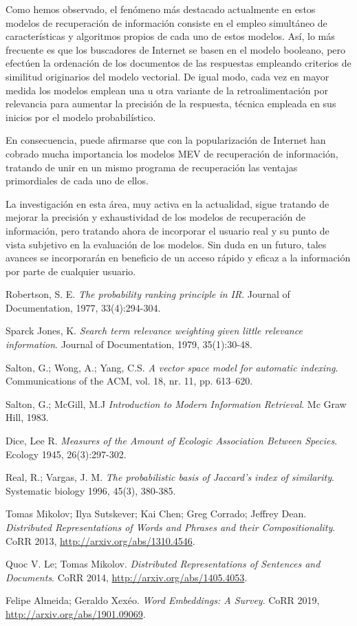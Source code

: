 \documentclass[titlepage]{article}
\begin{document}
Como hemos observado, el fenómeno más destacado actualmente en estos modelos de recuperación de información consiste en el empleo simultáneo de características y algoritmos propios de cada uno de estos modelos. Así, lo más frecuente es que los buscadores de Internet se basen en el modelo booleano, pero efectúen la ordenación de los documentos de las respuestas empleando criterios de similitud originarios del modelo vectorial. De igual modo, cada vez en mayor medida los modelos emplean una u otra variante de la retroalimentación por relevancia para aumentar la precisión de la respuesta, técnica empleada en sus inicios por el modelo probabilístico.

En consecuencia, puede afirmarse que con la popularización de Internet han cobrado mucha importancia los modelos MEV de recuperación de información, tratando de unir en un mismo programa de recuperación las ventajas primordiales de cada uno de ellos. 

La investigación en esta área, muy activa en la actualidad, sigue tratando de mejorar la precisión y exhaustividad de los modelos de recuperación de información, pero tratando ahora de incorporar el usuario real y su punto de vista subjetivo en la evaluación de los modelos. Sin duda en un futuro, tales avances se incorporarán en beneficio de un acceso rápido y eficaz a la información por parte de cualquier usuario.

\renewcommand{\refname}{Bibliografía}
\begin{thebibliography}{999}

Robertson, S. E.
\emph{The probability ranking principle in IR}.
Journal of Documentation, 1977, 33(4):294-304.

Sparck Jones, K.
\emph{Search term relevance weighting given little relevance information}.
Journal of Documentation, 1979, 35(1):30-48.

Salton, G.; Wong, A.; Yang, C.S.
\emph{A vector space model for automatic indexing}.
Communications of the ACM, vol. 18, nr. 11, pp. 613–620.

Salton, G.; McGill, M.J
\emph{Introduction to Modern Information Retrieval}.
Mc Graw Hill, 1983.

Dice, Lee R.
\emph{Measures of the Amount of Ecologic Association Between Species}.
Ecology 1945, 26(3):297-302.

Real, R.; Vargas, J. M.
\emph{The probabilistic basis of Jaccard's index of similarity}.
Systematic biology 1996, 45(3), 380-385.

Tomas Mikolov; Ilya Sutskever; Kai Chen; Greg Corrado; Jeffrey Dean.
\emph{Distributed Representations of Words and Phrases and their Compositionality}.
CoRR 2013, \url{http://arxiv.org/abs/1310.4546}.

Quoc V. Le; Tomas Mikolov.
\emph{Distributed Representations of Sentences and Documents}.
CoRR 2014, \url{http://arxiv.org/abs/1405.4053}.

Felipe Almeida; Geraldo Xex{\'{e}}o.
\emph{Word Embeddings: A Survey}.
CoRR 2019, \url{http://arxiv.org/abs/1901.09069}.

\end{thebibliography}
\end{document}
